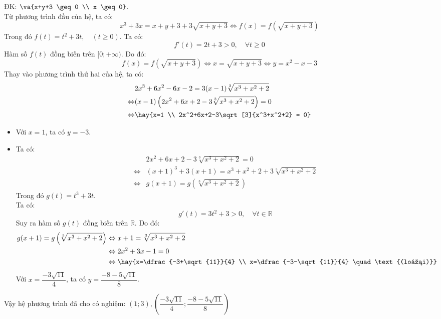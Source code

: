 ĐK: $\va{x+y+3 \geq 0 \\ x \geq 0}$.\\
Từ phương trình đầu của hệ, ta có:
$$x^3+3x=x+y+3+3\sqrt{x+y+3} \Leftrightarrow f(x) = f\left( \sqrt{x+y+3} \right)$$
Trong đó $f(t) = t^2+3t, \quad (t \geq 0)$. Ta có:
$$f'(t) = 2t+3 >0, \quad \forall t \geq 0$$
Hàm số $f(t)$ đồng biến trên $[0;+\infty)$. Do đó:
$$f(x) = f\left( \sqrt{x+y+3} \right) \Leftrightarrow x = \sqrt{x+y+3} \Leftrightarrow y = x^2-x-3$$
Thay vào phương trình thứ hai của hệ, ta có:
\begin{align*}
& 2x^3+6x^2-6x-2=3(x-1)\sqrt[3]{x^3+x^2+2} \\ \Leftrightarrow & (x-1) \left( 2x^2+6x+2-3 \sqrt[3]{x^3+x^2+2}\right) = 0 \\ \Leftrightarrow & \hay{x=1 \\ 2x^2+6x+2-3\sqrt[3]{x^3+x^2+2} = 0}
\end{align*}
\begin{itemize}
\item Với $x=1$, ta có $y=-3$.
\item Ta có:
\begin{align*}
& 2x^2+6x+2-3\sqrt[3]{x^3+x^2+2} = 0\\
\Leftrightarrow & (x+1)^3+3(x+1) = x^3+x^2+2+3\sqrt[3]{x^3+x^2+2} \\ \Leftrightarrow & g(x+1) = g\left(\sqrt[3]{x^3+x^2+2}\right)
\end{align*}
Trong đó $g(t) = t^3+3t$. \\
Ta có:
$$g'(t) = 3t^2+3 > 0, \quad \forall t \in \mathbb{R}$$
Suy ra hàm số $g(t)$ đồng biến trên $\mathbb{R}$. Do đó:
\begin{align*}
g(x+1) = g\left(\sqrt[3]{x^3+x^2+2}\right) & \Leftrightarrow
x+1 =  \sqrt[3]{x^3+x^2+2} \\ & \Leftrightarrow 2x^2+3x-1=0 \\ & \Leftrightarrow \hay{x=\dfrac{-3+\sqrt{11}}{4} \\ x=\dfrac{-3-\sqrt{11}}{4} \quad \text{(loại)}}
\end{align*}
Với $x=\dfrac{-3\sqrt{11}}{4}$, ta có $y= \dfrac{-8-5\sqrt{11}}{8}$.
\end{itemize}
Vậy hệ phương trình đã cho có nghiệm: $(1;3), \left(\dfrac{-3\sqrt{11}}{4};\dfrac{-8-5\sqrt{11}}{8} \right)$
